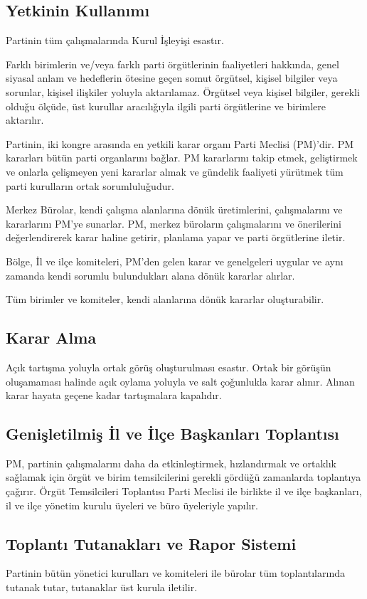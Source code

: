 \documentclass[11pt]{article} %
\begin{document}
\subsection{Yetkinin Kullanımı}
Partinin tüm çalışmalarında Kurul İşleyişi esastır.

Farklı birimlerin ve/veya farklı parti örgütlerinin faaliyetleri hakkında, genel siyasal anlam ve hedeflerin ötesine geçen somut örgütsel, kişisel bilgiler veya sorunlar, kişisel ilişkiler yoluyla aktarılamaz. Örgütsel veya kişisel bilgiler, gerekli olduǧu ölçüde, üst kurullar aracılıǧıyla ilgili parti örgütlerine ve birimlere aktarılır.

Partinin, iki kongre arasında en yetkili karar organı Parti Meclisi (PM)’dir. PM kararları bütün parti organlarını baǧlar. PM kararlarını takip etmek, geliştirmek ve onlarla çelişmeyen yeni kararlar almak ve gündelik faaliyeti yürütmek tüm parti kurulların ortak sorumluluǧudur.

Merkez Bürolar, kendi çalışma alanlarına dönük üretimlerini, çalışmalarını ve kararlarını PM’ye sunarlar. PM, merkez büroların çalışmalarını ve önerilerini deǧerlendirerek karar haline getirir, planlama yapar ve parti örgütlerine iletir.

Bölge, İl ve ilçe komiteleri, PM’den gelen karar ve genelgeleri uygular ve aynı zamanda kendi sorumlu bulundukları alana dönük kararlar alırlar.

Tüm birimler ve komiteler, kendi alanlarına dönük kararlar oluşturabilir.

\subsection{Karar Alma}
Açık tartışma yoluyla ortak görüş oluşturulması esastır. Ortak bir görüşün oluşamaması halinde açık oylama yoluyla ve salt çoǧunlukla karar alınır. Alınan karar hayata geçene kadar tartışmalara kapalıdır.
\subsection{Genişletilmiş İl ve İlçe Başkanları Toplantısı}
PM, partinin çalışmalarını daha da etkinleştirmek, hızlandırmak ve ortaklık saǧlamak için örgüt ve birim temsilcilerini gerekli gördüǧü zamanlarda toplantıya çaǧırır. Örgüt Temsilcileri Toplantısı Parti Meclisi ile birlikte il ve ilçe başkanları, il ve ilçe yönetim kurulu üyeleri ve büro üyeleriyle yapılır.
\subsection{Toplantı Tutanakları ve Rapor Sistemi}
Partinin bütün yönetici kurulları ve komiteleri ile bürolar tüm toplantılarında tutanak tutar, tutanaklar üst kurula iletilir.
\end{document}
